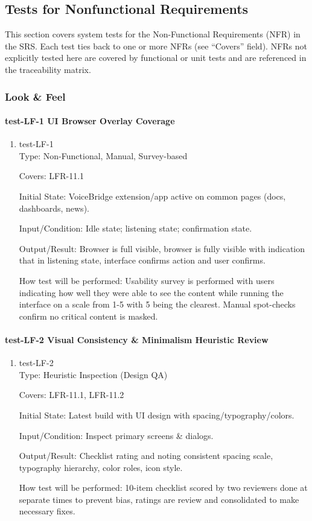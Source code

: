 \documentclass[12pt, titlepage]{article}
\begin{document}
\subsection{Tests for Nonfunctional Requirements}

This section covers system tests for the Non-Functional Requirements (NFR) in the SRS. Each test ties back to one or more NFRs (see “Covers” field). NFRs not explicitly tested here are covered by functional or unit tests and are referenced in the traceability matrix.

\subsubsection{Look \& Feel}

\paragraph{test-LF-1 UI Browser Overlay Coverage}

\begin{enumerate}
\item{test-LF-1\\}
Type: Non-Functional, Manual, Survey-based

Covers: LFR-11.1

Initial State: VoiceBridge extension/app active on common pages (docs, dashboards, news).

Input/Condition: Idle state; listening state; confirmation state.

Output/Result: Browser is full visible, browser is fully visible with indication that in listening state, interface confirms action and user confirms.

How test will be performed: Usability survey is performed with users indicating how well they were able to see the content while running the interface on a scale from 1-5 with 5 being the clearest. Manual spot-checks confirm no critical content is masked.
\end{enumerate}

\paragraph{test-LF-2 Visual Consistency \& Minimalism Heuristic Review}

\begin{enumerate}
\item{test-LF-2\\}
Type: Heuristic Inspection (Design QA)

Covers: LFR-11.1, LFR-11.2

Initial State: Latest build with UI design with spacing/typography/colors.

Input/Condition: Inspect primary screens \& dialogs.

Output/Result: Checklist rating and noting consistent spacing scale, typography hierarchy, color roles, icon style.

How test will be performed: 10-item checklist scored by two reviewers done at separate times to prevent bias, ratings are review and consolidated to make necessary fixes.
\end{enumerate}
\end{document}
